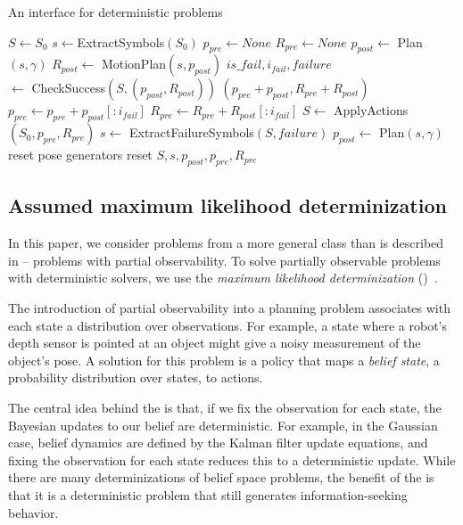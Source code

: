 \begin{algorithm}
 \caption{An interface for deterministic problems} \label{alg-ifop}
 \begin{algorithmic}[1]
  \State $S \leftarrow S_0$
  \State $s \leftarrow $ExtractSymbols$(S_0)$
  \State $p_{pre} \leftarrow None$
  \State $R_{pre} \leftarrow None$
  \State $p_{post} \leftarrow $ Plan$(s, \gamma)$
     \State $R_{post} \leftarrow $ MotionPlan$(s, p_{post})$
     \State $is\_fail, i_{fail}, failure$\\\hspace{50pt}$ \leftarrow $ CheckSuccess$(S, (p_{post}, R_{post}))$
         \State \Return $(p_{pre} + p_{post}, R_{pre} + R_{post})$
     \EndIf
     \State $p_{pre} \leftarrow p_{pre} + p_{post}[:i_{fail}]$
     \State $R_{pre} \leftarrow R_{pre} + R_{post}[:i_{fail}]$
     \State $S \leftarrow $ ApplyActions$(S_0, p_{pre}, R_{pre})$
     \State $s\leftarrow $ ExtractFailureSymbols$(S, failure)$
     \State $p_{post} \leftarrow $ Plan$(s, \gamma)$     
        \State reset pose generators
        \State reset $S, s, p_{post}, p_{pre}, R_{pre}$
     \EndIf
  \EndWhile
  \EndProcedure
 \end{algorithmic}
\end{algorithm}


\subsection{Assumed maximum likelihood determinization}
In this paper, we consider problems from a more general class than is
described in  -- problems with partial
observability. To solve partially observable problems with
deterministic solvers, we use the \emph{maximum
  likelihood determinization} (\mld)~\cite{platt2010belief}.

The introduction of partial observability into a planning problem
associates with each state a distribution over observations. For
example, a state where a robot's depth sensor is pointed at an object
might give a noisy measurement of the object's pose. A solution for
this problem is a policy that maps a \emph{belief state}, a
probability distribution over states, to actions.

The central idea behind the \mld{} is that, if we fix the observation
for each state, the Bayesian updates to our belief are
deterministic. For example, in the Gaussian case, belief dynamics are
defined by the Kalman filter update equations, and fixing the observation
for each state reduces this to a deterministic update. While there are many
determinizations of belief space problems, the benefit of the \mld{}
is that it is a deterministic problem that still generates information-seeking behavior.


